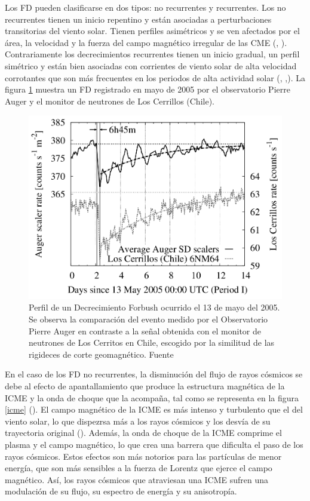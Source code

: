  Los FD pueden clasificarse en dos tipos: no recurrentes y recurrentes. Los no recurrentes tienen un inicio repentino y están asociadas a perturbaciones transitorias del viento solar. Tienen perfiles asimétricos y se ven afectados por el área, la velocidad y la fuerza del campo magnético irregular de las CME (\cite{cane2000}, \cite{lingri_2016}). Contrariamente los decrecimientos recurrentes tienen un inicio gradual, un perfil simétrico y están bien asociadas con corrientes de viento solar de alta velocidad corrotantes que son más frecuentes en los periodos de alta actividad solar (\cite{lingri_2016}, \cite{kallaya_2021},\cite{wang_2023}). La figura \ref{forbush}  muestra un FD registrado en mayo de 2005 por el observatorio Pierre Auger y el monitor de neutrones de Los Cerrillos (Chile). 
\begin{figure}[H]
    \centering
    \includegraphics[width=0.6\linewidth]{Figs/mauro_forbush.png}
    \caption{Perfil de un Decrecimiento Forbush ocurrido el 13 de mayo del 2005. Se observa la comparación del evento medido por el Observatorio Pierre Auger en contraste a la señal obtenida con el monitor de neutrones de Los Cerritos en Chile, escogido por la similitud de las rigideces de corte geomagnético. Fuente \cite{asorey_2012}}
    \label{forbush}
\end{figure}
En el caso de los FD no recurrentes, la disminución del flujo de rayos cósmicos se debe al efecto de apantallamiento que produce la estructura magnética de la ICME y la onda de choque que la acompaña, tal como se representa en la figura \ref{icme} (\cite{papaioannou_2020}). El campo magnético de la ICME es más intenso y turbulento que el del viento solar, lo que dispezrsa más a los rayos cósmicos y los desvía de su trayectoria original (\cite{belov_2009}). Además, la onda de choque de la ICME comprime el plasma y el campo magnético, lo que crea una barrera que dificulta el paso de los rayos cósmicos. Estos efectos son más notorios para las partículas de menor energía, que son más sensibles a la fuerza de Lorentz que ejerce el campo magnético. Así, los rayos cósmicos que atraviesan una ICME sufren una modulación de su flujo, su espectro de energía y su anisotropía.

